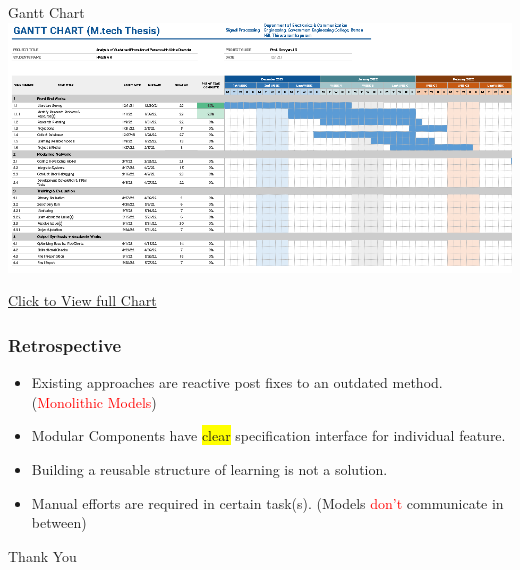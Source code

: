 \documentclass{beamer}
\def\nbrcircles {377}
\def\outerradius {30mm}
\def\deviation {.9}
\def\fudge {.62}
\newcounter{cumulArea}
\begin{document}
\begin{frame}{Gantt Chart}
 \includegraphics[width=\textwidth]{GanttChart1.PNG}
 \begin{center}
    \href{https://docs.google.com/spreadsheets/d/1GNJwdopzm6mXOZzkvvYEVpGXmIcgQHtT54OUhcYVjaM/edit?usp=sharing}{Click to View full Chart}
 \end{center}
\end{frame}
\begin{frame}
\frametitle{Retrospective}
\begin{itemize}
    \item Existing approaches are reactive post fixes to an outdated method.(\textcolor{red}{Monolithic Models})
    \item Modular Components have \colorbox{yellow}{clear} specification interface for individual feature.
    \item Building a reusable structure of learning is not a solution.
    \item Manual efforts are required in certain task(s). (Models \textcolor{red}{don't} communicate in between)
\end{itemize}
\end{frame}
\begin{frame}
\centering
{}
\Huge{\centerline{Thank You}}
\end{frame}
\end{document}
